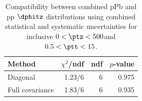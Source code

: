 \begin{table}[htp!]
\centering
\begin{tabular}{|l|r|r|r|}
\hline
Method & $\chi^2$/ndf & ndf & $p$-value \\
\hline
Diagonal & 1.23/6 & 6 & 0.975 \\
Full covariance & 1.83/6 & 6 & 0.935 \\
\hline
\end{tabular}
\caption{Compatibility between combined pPb and pp $\dphitz$ distributions using combined statistical and systematic uncertainties for inclusive $0 < \ptz < 500$\GeV and $0.5 < \ptt < 15$\GeV.}
\label{table:chisq_dphi}
\end{table}
